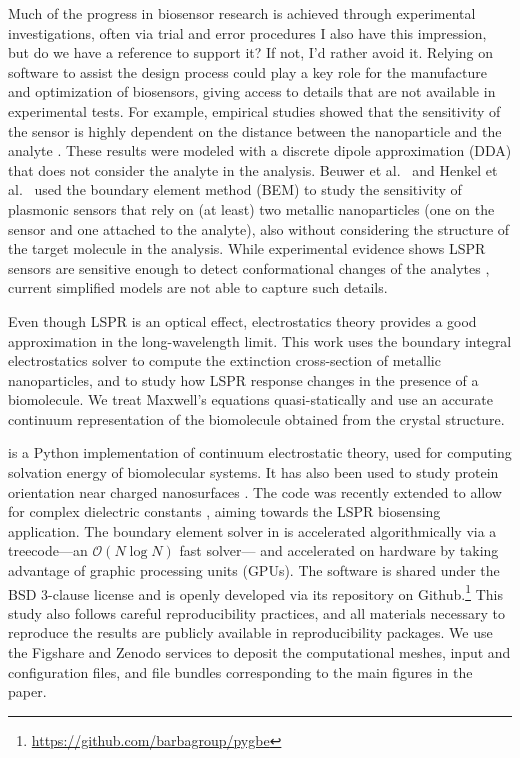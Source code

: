 Much of the progress in biosensor research is achieved 
through experimental investigations, often via trial and error procedures {\color{blue} I also have this impression, but do we have a reference to support it? If not, I'd rather avoid it}. 
Relying on software to assist the design process could play a key role for the manufacture 
and optimization of biosensors, giving access to details that are not available in experimental tests.
For example, empirical studies showed that the sensitivity of the sensor
is highly dependent on the distance between the nanoparticle and the analyte \cite{HaesETal2004}.
These results were modeled with a discrete dipole approximation (DDA) that does not consider the analyte in the analysis. 
Beuwer et al.~\cite{BeuwervanHoofZijlstra2018} and Henkel et al.~\cite{HenkelETal2018} used the boundary element method (BEM) to study the sensitivity of plasmonic sensors that rely on (at least) two metallic nanoparticles (one on the sensor and one attached to the analyte), also without considering the structure of the target molecule in the analysis.
While experimental evidence shows LSPR sensors are sensitive enough to detect 
conformational changes of the analytes \cite{HallETal2011}, 
current simplified models are not able to capture such details.


Even though LSPR is an optical effect, electrostatics theory
provides a good approximation in the long-wavelength limit. This work uses
the boundary integral electrostatics solver \pygbe \cite{CooperETal2016} 
to compute the extinction cross-section of metallic nanoparticles, and to study how LSPR 
response changes in the presence of a biomolecule. 
We treat Maxwell's equations quasi-statically \cite{MayergoyzZhang2007} and
use an accurate continuum representation of the biomolecule obtained from the
crystal structure. 

\pygbe is a Python implementation of continuum electrostatic theory, used
for computing solvation energy of biomolecular systems. 
It has also been used to study protein orientation near charged nanosurfaces \cite{CooperClementiBarba2015}.
The code was recently extended to allow for complex dielectric constants 
\cite{ClementiETal2017}, aiming towards the LSPR biosensing application. 
The boundary element solver in \pygbe
is accelerated algorithmically via a treecode---an $\mathcal{O}(N\log N)$ fast solver---
and accelerated on hardware by taking advantage of
graphic processing units (GPUs). The software is shared under the BSD 3-clause license 
and is openly developed via its repository on Github.\footnote{\url{https://github.com/barbagroup/pygbe}}
This study also follows careful reproducibility practices, and all materials necessary
to reproduce the results are publicly available in reproducibility packages.
We use the Figshare and Zenodo services to deposit the computational meshes,
input and configuration files, and file bundles corresponding to the main figures in the paper.



